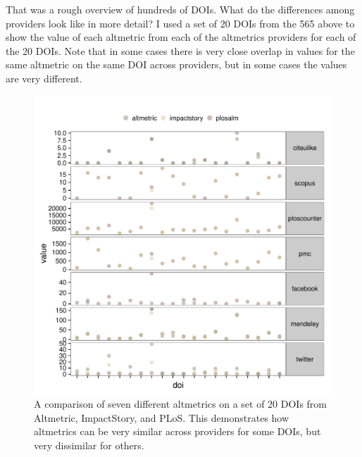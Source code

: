 \documentclass[letterpaper,superscriptaddress,showkeys,longbibliography]{revtex4-1}\usepackage{graphicx, color}
\newenvironment{knitrout}{}{} %
\begin{document}
That was a rough overview of hundreds of DOIs. What do the differences among providers look like in more detail? I used a set of 20 DOIs from the 565 above to show the value of each altmetric from each of the altmetrics providers for each of the 20 DOIs. Note that in some cases there is very close overlap in values for the same altmetric on the same DOI across providers, but in some cases the values are very different. 

\begin{knitrout}
\color{fgcolor}\begin{figure}[]


{\centering \includegraphics[width=.7\linewidth]{figure/dataconst2} 

}

\caption[A comparison of seven different altmetrics on a set of 20 DOIs from Altmetric, ImpactStory, and PLoS]{A comparison of seven different altmetrics on a set of 20 DOIs from Altmetric, ImpactStory, and PLoS. This demonstrates how altmetrics can be very similar across providers for some DOIs, but very dissimilar for others.\label{fig:dataconst2}}
\end{figure}


\end{knitrout}


\end{document}
